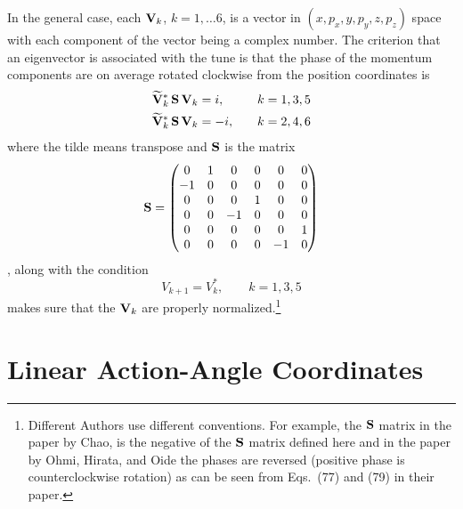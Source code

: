 In the general case, each ${\bf V}_k$, $k = 1, \ldots 6$, is a vector in $(x, p_x, y, p_y, z, p_z)$
space with each component of the vector being a complex number. The criterion that an eigenvector
is associated with the tune is that the phase of the momentum components are on average rotated
clockwise from the position coordinates is
\begin{alignat}{2}
  \widetilde{{\bf V}}_{k}^* \, {\bf S} \, {\bf V}_k &=  i, \quad &&k = 1, 3, 5 \nonumber \\
  \widetilde{{\bf V}}_{k}^* \, {\bf S} \, {\bf V}_k &= -i, \quad &&k = 2, 4, 6
  \label{vsvi0}
\end{alignat}
where the tilde means transpose and ${\bf S}$ is the matrix
\begin{equation}
  {\bf S} = \begin{pmatrix}
      0 &  1 &  0 &  0 &  0 &  0 \\
     -1 &  0 &  0 &  0 &  0 &  0 \\
      0 &  0 &  0 &  1 &  0 &  0 \\
      0 &  0 & -1 &  0 &  0 &  0 \\
      0 &  0 &  0 &  0 &  0 &  1 \\
      0 &  0 &  0 &  0 & -1 &  0 \\
  \end{pmatrix}
  \label{s010000}
\end{equation}
, along with the condition 
\begin{equation}
  V_{k+1} = V_k^*, \qquad k = 1, 3, 5
  \label{vv135}
\end{equation}
makes sure that the ${\bf V}_k$ are properly normalized.\footnote
  {
Different Authors use different conventions. For example, the ${\bf S}$ matrix in the paper by
Chao\cite{b:chao.spin}, is the negative of the ${\bf S}$ matrix defined here and in the paper by Ohmi,
Hirata, and Oide \cite{b:ohmi} the phases are reversed (positive phase is counterclockwise rotation)
as can be seen from Eqs.~(77) and (79) in their paper.
  }

\section{Linear Action-Angle Coordinates}
\label{s:action.ang}


